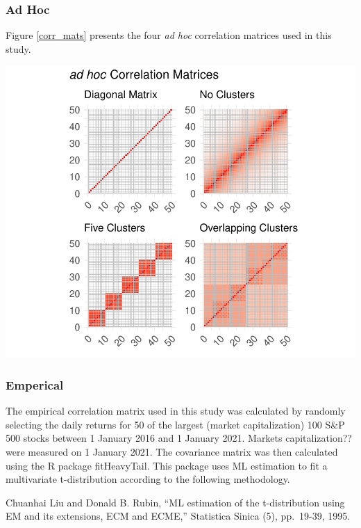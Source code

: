 \documentclass[11pt,preprint, authoryear]{elsarticle}
\let\origfigure\figure
\let\endorigfigure\endfigure
\renewenvironment{figure}[1][2] {
    \expandafter\origfigure\expandafter[H]
} {
    \endorigfigure
}
\numberwithin{equation}{section}
\numberwithin{figure}{section}
\numberwithin{table}{section}
\begin{document}
\hypertarget{ad-hoc}{%
\subsubsection{\texorpdfstring{Ad Hoc
\label{adhoc}}{Ad Hoc }}\label{ad-hoc}}

Figure \ref{corr_mats} presents the four \emph{ad hoc} correlation
matrices used in this study.

\begin{figure}
\centering
\includegraphics{Thesis_files/figure-latex/corr mats-1.pdf}
\caption{\label{corr_mats} Correlation Matricies}
\end{figure}

\hypertarget{emperical}{%
\subsubsection{\texorpdfstring{Emperical
\label{emp}}{Emperical }}\label{emperical}}

The empirical correlation matrix used in this study was calculated by
randomly selecting the daily returns for 50 of the largest (market
capitalization) 100 S\&P 500 stocks between 1 January 2016 and 1 January
2021. Markets capitalization?? were measured on 1 January 2021. The
covariance matrix was then calculated using the R package fitHeavyTail.
This package uses ML estimation to fit a multivariate t-distribution
according to the following methodology.

Chuanhai Liu and Donald B. Rubin, ``ML estimation of the t-distribution
using EM and its extensions, ECM and ECME,'' Statistica Sinica (5),
pp.~19-39, 1995.
\end{document}
